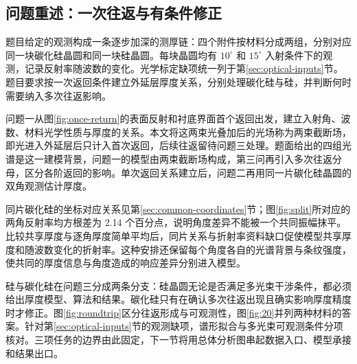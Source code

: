 \subsection{问题重述：一次往返与有条件修正}

题目给定的观测构成一条逐步加深的测厚链：四个附件按材料分成两组，分别对应同一块碳化硅晶圆和同一块硅晶圆。每块晶圆均有 $10^\circ$ 和 $15^\circ$ 入射条件下的观测，记录反射率随波数的变化。光学标定缺项统一列于第\ref{sec:optical-inputs}节。题目要求按一次返回条件建立外延层厚度关系，分别处理碳化硅与硅，并判断何时需要纳入多次往返影响。

问题一从图\ref{fig:once-return}的表面反射和衬底界面首个返回出发，建立入射角、波数、材料光学性质与厚度的关系。本文将这两束光叠加后的光场称为两束截断场，即光进入外延层后只计入首次返回，后续往返留待问题三处理。题面给出的四组光谱是这一建模背景，问题一的模型由两束截断场构成，第三问再引入多次往返分母，区分各阶返回的影响。单次返回关系建立后，问题二再用同一片碳化硅晶圆的双角观测估计厚度。

同片碳化硅的坐标对应关系见第\ref{sec:common-coordinates}节；图\ref{fig:split}所对应的两角反射率均方根差为 2.14 个百分点，说明角度差异不能被一个共同振幅抹平。比较共享厚度与逐角厚度简单平均后，同片关系与折射率资料缺口促使模型共享厚度和随波数变化的折射率。这种安排还保留每个角度各自的光谱背景与条纹强度，使共同的厚度信息与角度造成的响应差异分别进入模型。

硅与碳化硅在问题三分成两条分支：硅晶圆无论是否满足多光束干涉条件，都必须给出厚度模型、算法和结果。碳化硅只有在确认多次往返出现且确实影响厚度精度时才修正。图\ref{fig:roundtrip}区分往返形成与可观测性，图\ref{fig:20}并列两种材料的答案。针对第\ref{sec:optical-inputs}节的观测缺项，谱形拟合与多光束可观测条件分项核对。三项任务的边界由此固定，下一节将用总体分析图串起数据入口、模型承接和结果出口。
